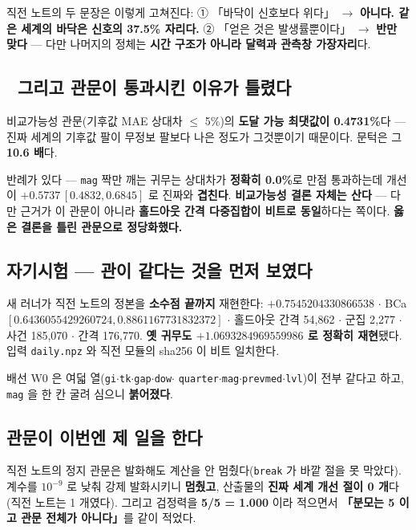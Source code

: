 \documentclass{article}
\begin{document}
직전 노트의 두 문장은 이렇게 고쳐진다:
① 「바닥이 신호보다 위다」 $\to$ \textbf{아니다. 같은 세계의 바닥은 신호의 37.5\% 자리다.}
② 「얻은 것은 발생률뿐이다」 $\to$ \textbf{반만 맞다} --- 다만 나머지의 정체는
\textbf{시간 구조가 아니라 달력과 관측창 가장자리}다.

\subsection{🔴 그리고 관문이 통과시킨 이유가 틀렸다}

비교가능성 관문(기후값 MAE 상대차 $\le$ 5\%)의 \textbf{도달 가능 최댓값이 0.4731\%}다 ---
진짜 세계의 기후값 팔이 무정보 팔보다 나은 정도가 그것뿐이기 때문이다.
문턱은 그 \textbf{10.6 배}다.

{반례가 있다 --- \texttt{mag} 짝만 깨는 귀무는 상대차가 \textbf{정확히 0.0\%}로 만점 통과하는데
개선이 $+0.5737\,[0.4832, 0.6845]$ 로 진짜와 \textbf{겹친다}.}
\textbf{비교가능성 결론 자체는 산다} --- 다만 근거가 이 관문이 아니라
\textbf{홀드아웃 간격 다중집합이 비트로 동일}하다는 쪽이다. \textbf{옳은 결론을 틀린 관문으로 정당화했다.}

\subsection{자기시험 --- 관이 같다는 것을 먼저 보였다}

새 러너가 직전 노트의 정본을 \textbf{소수점 끝까지} 재현한다:
$+0.7545204330866538$ $\cdot$ BCa $[0.6436055429260724, 0.8861167731832372]$ $\cdot$
홀드아웃 간격 54{,}862 $\cdot$ 군집 2{,}277 $\cdot$ 사건 185{,}070 $\cdot$ 간격 176{,}770.
\textbf{옛 귀무도 $+1.0693284969559986$ 로 정확히 재현}됐다.
입력 \texttt{daily.npz} 와 직전 모듈의 sha256 이 비트 일치한다.

배선 W0 은 여덟 열(\texttt{gi}$\cdot$\texttt{tk}$\cdot$\texttt{gap}$\cdot$\texttt{dow}$\cdot$
\texttt{quarter}$\cdot$\texttt{mag}$\cdot$\texttt{prevmed}$\cdot$\texttt{lvl})이 전부 같다고 하고,
\texttt{mag} 을 한 칸 굴려 심으니 \textbf{붉어졌다}.

\subsection{관문이 이번엔 제 일을 한다}

직전 노트의 정지 관문은 발화해도 계산을 안 멈췄다(\texttt{break} 가 바깥 절을 못 막았다).
계수를 $10^{-9}$ 로 낮춰 강제 발화시키니 \textbf{멈췄고}, 산출물의
\textbf{진짜 세계 개선 절이 0 개}다(직전 노트는 1 개였다).
그리고 검정력을 \textbf{5/5 = 1.000} 이라 적으면서 \textbf{「분모는 5 이고 관문 전체가 아니다」}를 같이 적었다.
\end{document}
